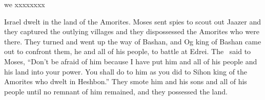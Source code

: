 \begin{inparaenum}
  \pb{}we xxxx\pa{}xxxx%

   Israel dwelt in the land of the Amorites.%
   Moses sent spies to scout out Jaazer and they captured the outlying villages and they dispossessed the Amorites who were there.%
   They turned and went up the way of Bashan, and Og king of Bashan came out to confront them, he and all of his people, to battle at Edrei.%
   The \lord\ said to Moses, ``Don't be afraid of him because I have put him and all of his people and his land into your power. You shall do to him as you did to Sihon king of the Amorites who dwelt in Heshbon.''%
   They smote him and his sons and all of his people until no remnant of him remained, and they possessed the land.%
\end{inparaenum}
